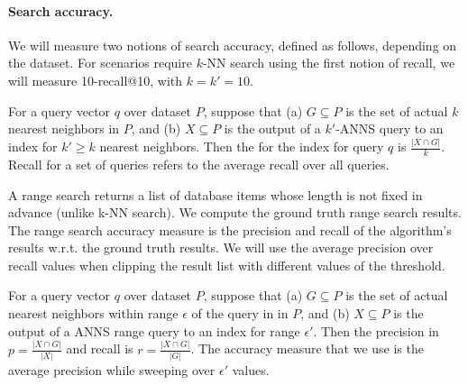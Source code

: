 \paragraph{Search accuracy.}

We will measure two notions of search accuracy, defined as follows,
depending on the dataset. For scenarios require $k$-NN search using
the first notion of recall, we will measure 10-recall@10, with
$k=k'=10$.

\begin{definition}[{\bf \recall{k}{k'}}]
  \label{def:recall}
  For a query vector $q$ over dataset $P$, suppose that (a) $G
  \subseteq P$ is the set of actual $k$ nearest neighbors in $P$, and
  (b) $X \subseteq P$ is the output of a $k'$-ANNS query to an index
  for $k' \geq k$ nearest neighbors. Then the  for the
  index for query $q$ is $\frac{|X \cap G|}{k}$. Recall for a set of
  queries refers to the average recall over all queries.
\end{definition}


A range search returns a list of database items whose length is not fixed in advance (unlike k-NN search).
We compute the ground truth range search results. 
The range search accuracy measure is the precision and recall of the algorithm's results w.r.t. the ground truth results.
We will use the average precision over recall values when clipping the result list with different values of the threshold.

\begin{definition}
  \label{def:rangeaccuracy}
  For a query vector $q$ over dataset $P$, suppose that (a) $G
  \subseteq P$ is the set of actual nearest neighbors within range $\epsilon$ 
  of the query in in $P$, and
  (b) $X \subseteq P$ is the output of a ANNS range query to an index
  for range $\epsilon'$. 
  Then the precision in $p=\frac{|X \cap G|}{|X|}$ and recall is $r=\frac{|X \cap G|}{|G|}$. 
  The accuracy measure that we use is the average precision while sweeping over $\epsilon'$ values.
\end{definition}



